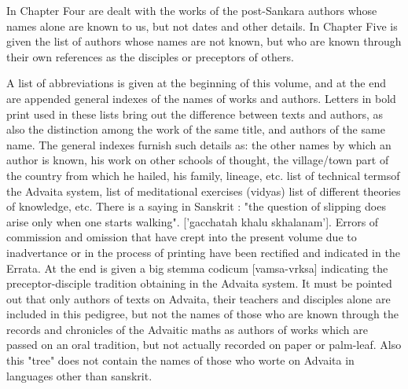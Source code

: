 In Chapter Four are dealt with the works of the post-Sankara authors whose names alone are known to us, but not dates and other details. In Chapter Five is given the list of authors whose names are not known, but who are known through their own references as the disciples or preceptors of others. 

A list of abbreviations is given at the beginning of this volume, and at the end are appended general indexes of the names of works and authors. Letters in bold print used in these lists bring out the difference between texts and authors, as also the distinction among the work of the same title, and authors  of the same name. The general indexes furnish such details as: the other names by which an author is known, his work on other schools of thought, the village/town part of the country from which he hailed, his family, lineage, etc. list of technical termsof the Advaita system, list of meditational exercises (vidyas) list of different theories of knowledge, etc. There is a saying in Sanskrit : "the question of slipping does arise only when one starts walking". ['gacchatah khalu skhalanam']. Errors of commission and omission that have crept into the present volume due to inadvertance or in the process of printing have been rectified and indicated in the Errata. At the end is given a big stemma codicum [vamsa-vrksa] indicating the preceptor-disciple tradition obtaining in the Advaita system. It must be pointed out that only authors of texts on Advaita, their teachers and disciples alone are included in this pedigree, but not the names of those who are known through the records and chronicles of the Advaitic maths as authors of works which are passed on an oral tradition, but not actually recorded on paper or palm-leaf. Also this "tree" does not contain the names of those who worte on Advaita in languages other than sanskrit. 

